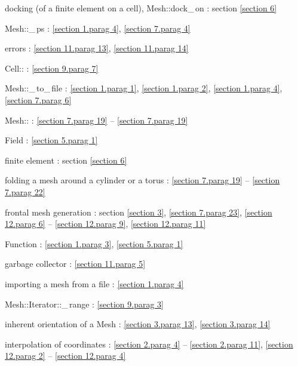 \documentclass[a4paper]{scrreprt}
\def\numb{}
\newcommand\verm[1]{\textcolor{manif}{#1}}
\renewcommand\tt{\normalfont\ttfamily}
\begin{document}
\noindent
docking (of a finite element on a cell), {\small\tt\verm{Mesh}::dock\_\,on} :
section \ref{\numb section 6}

\noindent
{\small\tt\verm{Mesh}::\_\,ps} : \ref{\numb section 1.\numb parag 4},
\ref{\numb section 7.\numb parag 4}

\noindent
errors : \ref{\numb section 11.\numb parag 13}, \ref{\numb section 11.\numb parag 14}

\noindent
{\small\tt\verm{Cell}::} : \ref{\numb section 9.\numb parag 7}

\noindent
{\small\tt\verm{Mesh}::\_\,to\_\,file} : \ref{\numb section 1.\numb parag 1},
\ref{\numb section 1.\numb parag 2}, \ref{\numb section 1.\numb parag 4},
\ref{\numb section 7.\numb parag 6}

\noindent
{\small\tt\verm{Mesh}::} :
\ref{\numb section 7.\numb parag 19} -- \ref{\numb section 7.\numb parag 19}

\noindent
{\small\tt \verm{Field}} : \ref{\numb section 5.\numb parag 1}

\noindent
finite element : section \ref{\numb section 6}

\noindent
folding a mesh around a cylinder or a torus : \ref{\numb section 7.\numb parag 19} --
\ref{\numb section 7.\numb parag 22}

\noindent
frontal mesh generation : section \ref{\numb section 3}, \ref{\numb section 7.\numb parag 23},
\ref{\numb section 12.\numb parag 6} -- \ref{\numb section 12.\numb parag 9},
\ref{\numb section 12.\numb parag 11}

\noindent
{\small\tt \verm{Function}} : \ref{\numb section 1.\numb parag 3},
\ref{\numb section 5.\numb parag 1}

\noindent
garbage collector : \ref{\numb section 11.\numb parag 5}

\noindent
importing a mesh from a file : \ref{\numb section 1.\numb parag 4}

\noindent
{\small\tt\verm{Mesh}::Iterator::\_\,range} : \ref{\numb section 9.\numb parag 3}

\noindent
inherent orientation of a {\small\tt\verm{Mesh}} : \ref{\numb section 3.\numb parag 13},
\ref{\numb section 3.\numb parag 14}

\noindent
interpolation of coordinates :
\ref{\numb section 2.\numb parag 4} -- \ref{\numb section 2.\numb parag 11},
\ref{\numb section 12.\numb parag 2} -- \ref{\numb section 12.\numb parag 4}
\end{document}
